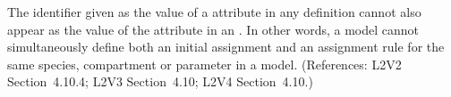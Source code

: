 The identifier given as the value of a 
attribute in any \InitialAssignment definition cannot also appear
as the value of the  attribute in an
\AssignmentRule.  In other words, a model cannot
simultaneously define both an initial assignment and an assignment rule for
the same species, compartment or parameter in a model.
(References: L2V2 Section~4.10.4; L2V3
Section~4.10; L2V4 Section~4.10.)

